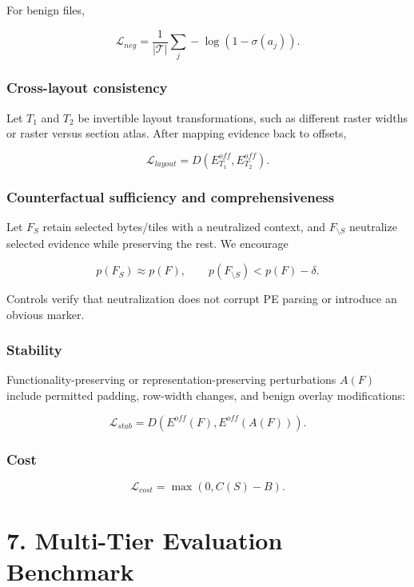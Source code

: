 \documentclass[
  10pt,
]{article}
\begin{document}
For benign files,

\[
\mathcal{L}_{neg}=\frac{1}{|\mathcal{T}|}\sum_j -\log(1-\sigma(a_j)).
\]

\subsubsection{Cross-layout consistency}\label{cross-layout-consistency}

Let \(T_1\) and \(T_2\) be invertible layout transformations, such as
different raster widths or raster versus section atlas. After mapping
evidence back to offsets,

\[
\mathcal{L}_{layout}=D(E^{off}_{T_1},E^{off}_{T_2}).
\]

\subsubsection{Counterfactual sufficiency and
comprehensiveness}\label{counterfactual-sufficiency-and-comprehensiveness}

Let \(F_S\) retain selected bytes/tiles with a neutralized context, and
\(F_{\setminus S}\) neutralize selected evidence while preserving the
rest. We encourage

\[
p(F_S) \approx p(F), \qquad p(F_{\setminus S}) < p(F)-\delta.
\]

Controls verify that neutralization does not corrupt PE parsing or
introduce an obvious marker.

\subsubsection{Stability}\label{stability}

Functionality-preserving or representation-preserving perturbations
\(A(F)\) include permitted padding, row-width changes, and benign
overlay modifications:

\[
\mathcal{L}_{stab}=D(E^{off}(F),E^{off}(A(F))).
\]

\subsubsection{Cost}\label{cost}

\[
\mathcal{L}_{cost}=\max(0,C(S)-B).
\]

\section{7. Multi-Tier Evaluation
Benchmark}\label{multi-tier-evaluation-benchmark}
\end{document}

